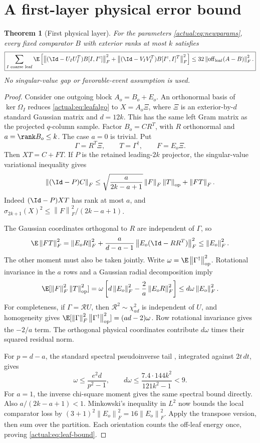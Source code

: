 \documentclass[11pt,oneside,openany,a4paper]{book}
\numberwithin{equation}{chapter}
\newtheorem{theorem}{Theorem}[chapter]
\theoremstyle{definition}
\theoremstyle{remark}
\newcommand{\F}[1]{\left\lVert#1\right\rVert_F}
\newcommand{\op}[1]{\left\lVert#1\right\rVert_{\rm op}}
\begin{document}
\section{A first-layer physical error bound}
\begin{theorem}[First physical layer]\label{actual:thm:leaf}
For the parameters \eqref{actual:eq:newparams}, every fixed comparator $B$ with exterior ranks at most $k$ satisfies
\begin{equation}\label{actual:eq:leaf-bound}
 \boxed{\sum_{I\text{ coarse leaf}}\E\left[
 \F{(\Id-U_IU_I^T)B[I,I^c]}^2+
 \F{(\Id-V_IV_I^T)B[I^c,I]^T}^2\right]
 \le32\F{\operatorname{off}_{\rm leaf}(A-B)}^2.}
\end{equation}
No singular-value gap or favorable-event assumption is used.
\end{theorem}
\begin{proof}
Consider one outgoing block $A_o=B_o+E_o$. An orthonormal basis of $\ker\Omega_I$ reduces \eqref{actual:eq:leafalgo} to
$X=A_o\Xi$, where $\Xi$ is an exterior-by-$d$ standard Gaussian matrix and $d=12k$. This has the same left Gram matrix as the projected $q$-column sample. Factor $B_o=CR^T$, with $R$ orthonormal and $a=\rank B_o\le k$. The case $a=0$ is trivial. Put
\[
 \Gamma=R^T\Xi,\qquad T=\Gamma^\dagger,\qquad F=E_o\Xi.
\]
Then $XT=C+FT$. If $P$ is the retained leading-$2k$ projector, the singular-value variational inequality gives
\[
 \F{(\Id-P)C}
 \le\sqrt{\frac{a}{2k-a+1}}\F F\op T+\F{FT}.
\]
Indeed $(\Id-P)XT$ has rank at most $a$, and
$\sigma_{2k+1}(X)^2\le\F F^2/(2k-a+1)$.

The Gaussian coordinates orthogonal to $R$ are independent of $\Gamma$, so
\begin{equation}\label{actual:eq:joint1}
 \E\F{FT}^2=\F{E_oR}^2+
       \frac{a}{d-a-1}\F{E_o(\Id-RR^T)}^2\le\F{E_o}^2.
\end{equation}
The other moment must also be taken jointly. Write
$\omega=\E\op{\Gamma^\dagger}^2$. Rotational invariance in the $a$ rows and a Gaussian radial decomposition imply
\begin{equation}\label{actual:eq:joint2}
 \E[\F F^2\op T^2]
 =\omega\left[d\F{E_o}^2-\frac2a\F{E_oR}^2\right]
 \le d\omega\F{E_o}^2.
\end{equation}
For completeness, if $\Gamma=\mathcal R U$, then
$\mathcal R^2\sim\chi^2_{ad}$ is independent of $U$, and homogeneity gives
$\E[\F\Gamma^2\op{\Gamma^\dagger}^2]=(ad-2)\omega$.
Row rotational invariance gives the $-2/a$ term. The orthogonal physical coordinates contribute $d\omega$ times their squared residual norm.

For $p=d-a$, the standard spectral pseudoinverse tail \cite{HMT}, integrated against $2t\,dt$, gives
\[
 \omega\le\frac{e^2d}{p^2-1},\qquad
 d\omega\le\frac{7.4\cdot144k^2}{121k^2-1}<9.
\]
For $a=1$, the inverse chi-square moment gives the same spectral bound directly. Also $a/(2k-a+1)<1$. Minkowski's inequality in $L^2$ now bounds the local comparator loss by
$(3+1)^2\F{E_o}^2=16\F{E_o}^2$. Apply the transpose version, then sum over the partition. Each orientation counts the off-leaf energy once, proving \eqref{actual:eq:leaf-bound}.
\end{proof}
\end{document}
